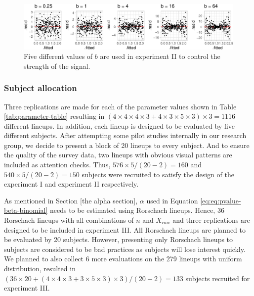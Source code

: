 \documentclass[]{interact}
\theoremstyle{plain}%
\theoremstyle{definition}
\theoremstyle{remark}
\begin{document}
\begin{figure}

{\centering \includegraphics[width=1\linewidth]{paper_comparison_files/figure-latex/different-b-1} 

}

\caption{Five different values of $b$ are used in experiment II to control the strength of the signal.}\label{fig:different-b}
\end{figure}

\hypertarget{subject-allocation}{%
\subsubsection{Subject allocation}\label{subject-allocation}}

Three replications are made for each of the parameter values shown in
Table \ref{tab:parameter-table} resulting in
\((4 \times 4 \times 4 \times 3 + 4 \times 3 \times 5 \times 3) \times 3 = 1116\)
different lineups. In addition, each lineup is designed to be evaluated
by five different subjects. After attempting some pilot studies
internally in our research group, we decide to present a block of 20
lineups to every subject. And to ensure the quality of the survey data,
two lineups with obvious visual patterns are included as attention
checks. Thus, \(576 \times 5/(20-2) = 160\) and
\(540 \times 5 /(20-2) = 150\) subjects were recruited to satisfy the
design of the experiment I and experiment II respectively.

As mentioned in Section {[}the alpha section{]}, \(\alpha\) used in
Equation \ref{eq:eq:pvalue-beta-binomial} needs to be estimated using
Rorschach lineups. Hence, 36 Rorschach lineups with all combinations of
\(n\) and \(X_{raw}\) and three replications are designed to be included
in experiment III. All Rorschach lineups are planned to be evaluated by
20 subjects. However, presenting only Rorschach lineups to subjects are
considered to be bad practices as subjects will lose interest quickly.
We planned to also collect 6 more evaluations on the 279 lineups with
uniform distribution, resulted in
\((36 \times 20 + (4 \times 4 \times 3 + 3 \times 5 \times 3) \times 3)/(20-2) = 133\)
subjects recruited for experiment III.
\end{document}
